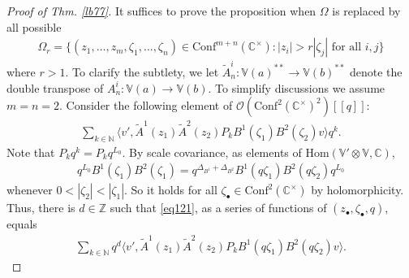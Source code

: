 \documentclass[11pt,b5paper,notitlepage]{article}
\theoremstyle{definition}
\theoremstyle{plain}
\newcommand{\wtd}{\widetilde}
\newcommand{\Hom}{\mathrm{Hom}}
\newcommand{\Conf}{\mathrm{Conf}}
\newcommand{\bk}[1]{\langle {#1}\rangle}
\newcommand{\scr}{\mathscr}
\newcommand{\blt}{\bullet}
\newcommand{\Vbb}{\mathbb V}
\newcommand{\Cbb}{\mathbb C}
\newcommand{\Nbb}{\mathbb N}
\newcommand{\Zbb}{\mathbb Z}
\numberwithin{equation}{section}
\begin{document}
\begin{proof}[Proof of Thm. \ref{lb77}]
It suffices to prove the proposition when $\Omega$ is replaced by all possible
\begin{align*}
	\Omega_r=\{(z_1,\dots,z_m,\zeta_1,\dots,\zeta_n)\in\Conf^{m+n}(\Cbb^\times):|z_i|>r|\zeta_j|\text{ for all }i,j\}
\end{align*}
where $r>1$. To clarify the subtlety, we let $\wtd A^i_n:\Vbb(a)^{**}\rightarrow\Vbb(b)^{**}$ denote the double transpose of $A^i_n:\Vbb(a)\rightarrow\Vbb(b)$.   To simplify discussions we assume $m=n=2$. Consider the following element of $\scr O(\Conf^2(\Cbb^\times)^2)[[q]]$:
\begin{align}
\sum_{k\in\Nbb}\bk{v',\wtd A^1(z_1)\wtd A^2(z_2)P_kB^1(\zeta_1)B^2(\zeta_2)v}q^k.\label{eq121}
\end{align}
Note that $P_kq^k=P_kq^{L_0}$. By scale covariance, as elements of $\Hom(\Vbb'\otimes\Vbb,\Cbb)$,
\begin{align}
q^{L_0}B^1(\zeta_1)B^2(\zeta_1)=q^{\Delta_{B^1}+\Delta_{B^2}}B^1(q\zeta_1)B^2(q\zeta_2)q^{L_0}	
\end{align}
whenever $0<|\zeta_2|<|\zeta_1|$. So it holds for all $\zeta_\blt\in\Conf^2(\Cbb^\times)$ by holomorphicity. Thus, there is  $d\in\Zbb$ such that \eqref{eq121}, as a series of functions of $(z_\blt,\zeta_\blt,q)$, equals
\begin{align}
\sum_{k\in\Nbb}q^d\bk{v',\wtd A^1(z_1)\wtd A^2(z_2)P_kB^1(q\zeta_1)B^2(q\zeta_2)v}.	\label{eq100}
\end{align}


\end{proof}
\end{document}
